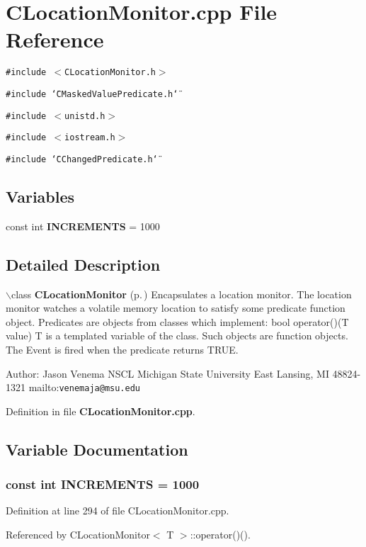 \section{CLocation\-Monitor.cpp File Reference}
\label{CLocationMonitor_8cpp}
{\tt \#include $<$CLocation\-Monitor.h$>$}\par
{\tt \#include \char`\"{}CMasked\-Value\-Predicate.h\char`\"{}}\par
{\tt \#include $<$unistd.h$>$}\par
{\tt \#include $<$iostream.h$>$}\par
{\tt \#include \char`\"{}CChanged\-Predicate.h\char`\"{}}\par
\subsection*{Variables}
\begin{CompactItemize}
\item 
const int {\bf INCREMENTS} = 1000
\end{CompactItemize}


\subsection{Detailed Description}


$\backslash$class {\bf CLocation\-Monitor} {\rm (p.\,\pageref{classCLocationMonitor})} Encapsulates a location monitor.  The location monitor watches a volatile memory location  to satisfy some predicate function object. Predicates are objects from classes which implement: bool operator()(T value) T is a templated variable of the class. Such objects are function objects. The  Event is fired when the predicate returns TRUE.

Author: Jason Venema NSCL Michigan State University East Lansing, MI 48824-1321 mailto:{\tt venemaja@msu.edu}



Definition in file {\bf CLocation\-Monitor.cpp}.

\subsection{Variable Documentation}
\subsubsection{\setlength{\rightskip}{0pt plus 5cm}const int INCREMENTS = 1000\hspace{0.3cm}{\tt  [static]}}\label{CLocationMonitor_8cpp_a0}




Definition at line 294 of file CLocation\-Monitor.cpp.

Referenced by CLocation\-Monitor$<$ T $>$::operator()().